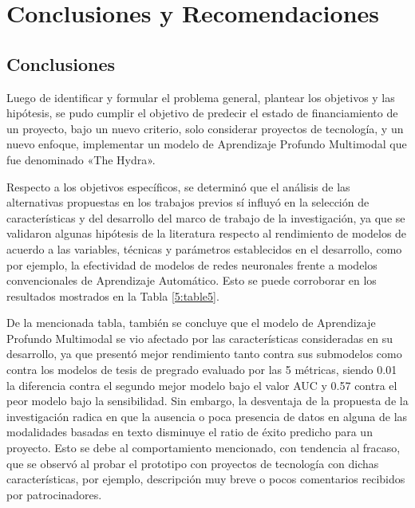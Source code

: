 \chapter{Conclusiones y Recomendaciones}
\section{Conclusiones}
Luego de identificar y formular el problema general, plantear los objetivos y las hipótesis, se pudo cumplir el objetivo de predecir el estado de financiamiento de un proyecto, bajo un nuevo criterio, solo considerar proyectos de tecnología, y un nuevo enfoque, implementar un modelo de Aprendizaje Profundo Multimodal que fue denominado «The Hydra».

Respecto a los objetivos específicos, se determinó que el análisis de las alternativas propuestas en los trabajos previos sí influyó en la selección de características y del desarrollo del marco de trabajo de la investigación, ya que se validaron algunas hipótesis de la literatura respecto al rendimiento de modelos de acuerdo a las variables, técnicas y parámetros establecidos en el desarrollo, como por ejemplo, la efectividad de modelos de redes neuronales frente a modelos convencionales de Aprendizaje Automático. Esto se puede corroborar en los resultados mostrados en la Tabla \ref{5:table5}.

De la mencionada tabla, también se concluye que el modelo de Aprendizaje Profundo Multimodal se vio afectado por las características consideradas en su desarrollo, ya que presentó mejor rendimiento tanto contra sus submodelos como contra los modelos de tesis de pregrado evaluado por las 5 métricas, siendo 0.01 la diferencia contra el segundo mejor modelo bajo el valor AUC y 0.57 contra el peor modelo bajo la sensibilidad. Sin embargo, la desventaja de la propuesta de la investigación radica en que la ausencia o poca presencia de datos en alguna de las modalidades basadas en texto disminuye el ratio de éxito predicho para un proyecto. Esto se debe al comportamiento mencionado, con tendencia al fracaso, que se observó al probar el prototipo con proyectos de tecnología con dichas características, por ejemplo, descripción muy breve o pocos comentarios recibidos por patrocinadores.

